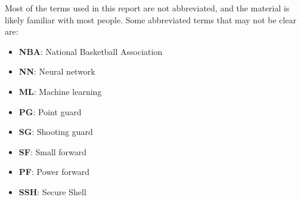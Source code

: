 Most of the terms used in this report are not abbreviated, and the material is likely familiar with most people. Some abbreviated terms that may not be clear are:\\
\begin{itemize}
\item\textbf{NBA}: National Basketball Association
\item\textbf{NN}: Neural network
\item\textbf{ML}: Machine learning
\item\textbf{PG}: Point guard
\item\textbf{SG}: Shooting guard
\item\textbf{SF}: Small forward
\item\textbf{PF}: Power forward
\item\textbf{SSH}: Secure Shell

\end{itemize}

